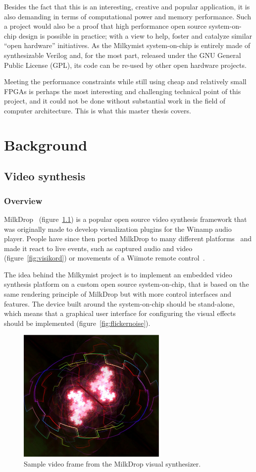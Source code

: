 \documentclass[a4paper,11pt]{kthesis}
\begin{document}
Besides the fact that this is an interesting, creative and popular application, it is also demanding in terms of computational power and memory performance. Such a project would also be a proof that high performance open source system-on-chip design is possible in practice; with a view to help, foster and catalyze similar ``open hardware'' initiatives. As the Milkymist system-on-chip is entirely made of synthesizable Verilog and, for the most part, released under the GNU General Public License (GPL), its code can be re-used by other open hardware projects.

Meeting the performance constraints while still using cheap and relatively small FPGAs is perhaps the most interesting and challenging technical point of this project, and it could not be done without substantial work in the field of computer architecture. This is what this master thesis covers.

\chapter{Background}
\section{Video synthesis}
\subsection{Overview}
MilkDrop~\cite{milkdrop} (figure~\ref{fig:milkdrop}) is a popular open source video synthesis framework that was originally made to develop visualization plugins for the Winamp audio player. People have since then ported MilkDrop to many different platforms~\cite{wpmilkdrop} and made it react to live events, such as captured audio and video~\cite{visikord} (figure~\ref{fig:visikord}) or movements of a Wiimote remote control~\cite{wiimodemd}.

The idea behind the Milkymist project is to implement an embedded video synthesis platform on a custom open source system-on-chip, that is based on the same rendering principle of MilkDrop but with more control interfaces and features. The device built around the system-on-chip should be stand-alone, which means that a graphical user interface for configuring the visual effects should be implemented (figure~\ref{fig:flickernoise}).

\begin{figure}[htp]
\centering
\includegraphics[height=65mm]{milkdrop2.eps}
\caption{Sample video frame from the MilkDrop visual synthesizer.}
\label{fig:milkdrop}
\end{figure}
\end{document}
